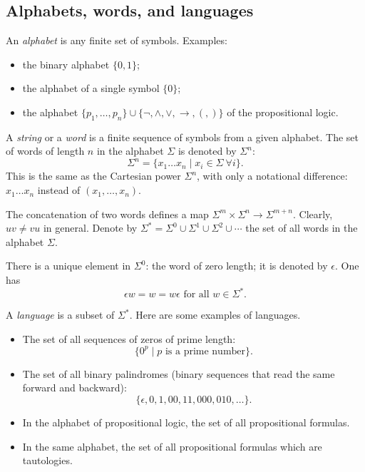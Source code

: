 

\setcounter{section}{1}
\setcounter{subsection}{2}
\setcounter{dfn}{0}

\subsection{Alphabets, words, and languages}
An \emph{alphabet} is any finite set of symbols.
Examples:
\begin{itemize}
\item
the binary alphabet $\{0,1\}$;
\item
the alphabet of a single symbol $\{0\}$;
\item
the alphabet $\{p_1, \ldots, p_n\} \cup \{\neg, \wedge, \vee, \to, (, )\}$ of the propositional logic.
\end{itemize}

A \emph{string} or a \emph{word} is a finite sequence of symbols from a given alphabet.
The set of words of length $n$ in the alphabet $\Sigma$ is denoted by $\Sigma^n$:
\[
\Sigma^n = \{x_1 \ldots x_n \mid x_i \in \Sigma\ \forall i\}.
\]
This is the same as the Cartesian power $\Sigma^n$, with only a notational difference: $x_1 \ldots x_n$
instead of $(x_1, \ldots, x_n)$.

The concatenation of two words defines a map $\Sigma^m \times \Sigma^n \to \Sigma^{m+n}$.
Clearly, $uv \ne vu$ in general.
Denote by $\Sigma^* = \Sigma^0 \cup \Sigma^1 \cup \Sigma^2 \cup \cdots$ the set of all words in the alphabet $\Sigma$.

There is a unique element in $\Sigma^0$: the word of zero length; it is denoted by $\epsilon$.
One has
\[
\epsilon w = w = w\epsilon \text{ for all } w \in \Sigma^*.
\]

A \emph{language} is a subset of $\Sigma^*$.
Here are some examples of languages.

\begin{itemize}
\item
The set of all sequences of zeros of prime length:
\[
\{0^p \mid p \text{ is a prime number}\}.
\]
\item
The set of all binary palindromes (binary sequences that read the same forward and backward):
\[
\{\epsilon, 0, 1, 00, 11, 000, 010, \ldots\}.
\]
\item
In the alphabet of propositional logic, the set of all propositional formulas.
\item
In the same alphabet, the set of all propositional formulas which are tautologies.
\end{itemize}






